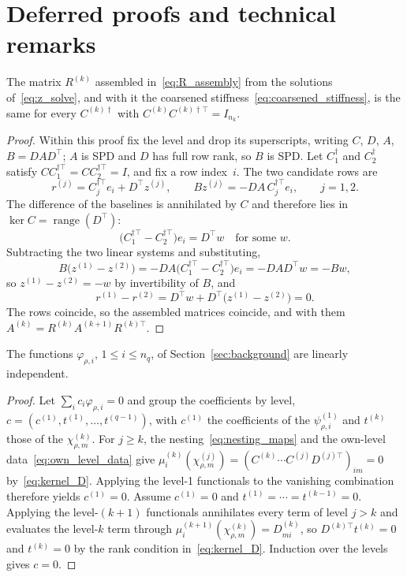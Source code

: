 \section{Deferred proofs and technical remarks}
\label{app:proofs}

\begin{lemma}\label{lem:cdagger_independence}
The matrix $R^{(k)}$ assembled in~\eqref{eq:R_assembly} from the solutions
of~\eqref{eq:z_solve}, and with it the coarsened
stiffness~\eqref{eq:coarsened_stiffness}, is the same for every
$C^{(k)\dagger}$ with $C^{(k)} C^{(k)\dagger\top} = I_{n_k}$.
\end{lemma}

\begin{proof}
Within this proof fix the level and drop its superscripts, writing $C$,
$D$, $A$, $B = DAD^\top$; $A$ is SPD and $D$ has
full row rank, so $B$ is SPD.  Let $C_1^{\dagger}$
and $C_2^{\dagger}$ satisfy $C C_1^{\dagger\top} = C C_2^{\dagger\top} = I$,
and fix a row index~$i$.  The two candidate rows are
\[
  r^{(j)} = C_j^{\dagger\top} e_i + D^\top z^{(j)},
  \qquad
  B z^{(j)} = -D A\, C_j^{\dagger\top} e_i,
  \qquad j = 1, 2 .
\]
The difference of the baselines is annihilated by $C$ and therefore lies in
$\ker C = \operatorname{range}(D^\top)$:
\[
  \bigl(C_1^{\dagger\top} - C_2^{\dagger\top}\bigr) e_i = D^\top w
  \quad \text{for some } w .
\]
Subtracting the two linear systems and substituting,
\[
  B\bigl(z^{(1)} - z^{(2)}\bigr)
  = -D A \bigl(C_1^{\dagger\top} - C_2^{\dagger\top}\bigr) e_i
  = -D A D^\top w = -B w ,
\]
so $z^{(1)} - z^{(2)} = -w$ by invertibility of $B$, and
\[
  r^{(1)} - r^{(2)}
  = D^\top w + D^\top\bigl(z^{(1)} - z^{(2)}\bigr) = 0 .
\]
The rows coincide, so the assembled matrices coincide, and with them
$A^{(k)} = R^{(k)} A^{(k+1)} R^{(k)\top}$.
\end{proof}


\begin{lemma}\label{lem:localized_independence}
The functions $\varphi_{\rho,i}$, $1 \leq i \leq n_q$, of
Section~\ref{sec:background} are linearly independent.
\end{lemma}

\begin{proof}
Let $\sum_i c_i \varphi_{\rho,i} = 0$ and group the coefficients by
level, $c = (c^{(1)}, t^{(1)}, \ldots, t^{(q-1)})$, with $c^{(1)}$ the
coefficients of the $\psi^{(1)}_{\rho,i}$ and $t^{(k)}$ those of the
$\chi^{(k)}_{\rho,m}$.  For $j \geq k$, the
nesting~\eqref{eq:nesting_maps} and the own-level
data~\eqref{eq:own_level_data} give
$\mu^{(k)}_i(\chi^{(j)}_{\rho,m})
 = (C^{(k)} \cdots C^{(j)} D^{(j)\top})_{im} = 0$
by~\eqref{eq:kernel_D}.  Applying the level-1 functionals to the
vanishing combination therefore yields $c^{(1)} = 0$.  Assume
$c^{(1)} = 0$ and $t^{(1)} = \cdots = t^{(k-1)} = 0$.  Applying the
level-$(k{+}1)$ functionals annihilates every term of level $j > k$ and
evaluates the level-$k$ term through
$\mu^{(k+1)}_i(\chi^{(k)}_{\rho,m}) = D^{(k)}_{mi}$, so
$D^{(k)\top} t^{(k)} = 0$ and $t^{(k)} = 0$ by the rank condition
in~\eqref{eq:kernel_D}.  Induction over the levels gives $c = 0$.
\end{proof}

